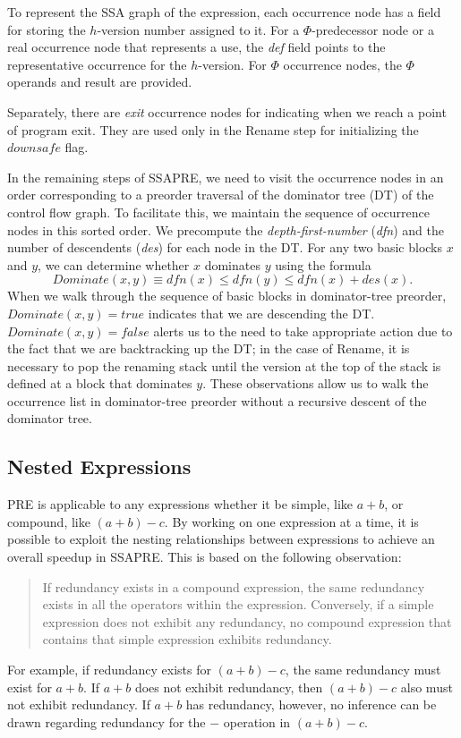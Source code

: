 To represent the SSA graph of the expression, each occurrence node has a field
for storing the $h$-version number assigned to it.  For a $\Phi$-predecessor
node or a real occurrence node that represents a use, the \emph{def} field
points to the representative occurrence for the $h$-version.  For $\Phi$
occurrence nodes, the $\Phi$ operands and result are provided.

Separately, there are \emph{exit} occurrence nodes for indicating when we
reach a point of program exit.  They are used only in the Rename step for
initializing the $downsafe$ flag.

In the remaining steps of SSAPRE, we need to visit the occurrence nodes in an
order corresponding to a preorder traversal of the dominator tree (DT) of the
control flow graph.  To facilitate this, we maintain the sequence of
occurrence nodes in this sorted order.  We precompute the 
\emph{depth-first-number} (\emph{dfn}) and the number of descendents
(\emph{des}) for each node in the DT.  For any two basic blocks $x$ and $y$,
we can determine whether $x$ dominates $y$ using the formula
$$Dominate(x,y) \equiv dfn(x) \leq dfn(y) \leq dfn(x) + des(x).$$
When we walk through the sequence of basic blocks in dominator-tree preorder,
$Dominate(x,y) = true$ indicates that we are descending the DT.
$Dominate(x,y) = false$ alerts us to the need to take appropriate action due
to the fact that we are backtracking up the DT; in the case of Rename, it is
necessary to pop the renaming stack until the version at the top of the stack
is defined at a block that dominates $y$.  These observations allow us to walk
the occurrence list in dominator-tree preorder without a recursive descent of
the dominator tree.

\subsection{Nested Expressions}

PRE is applicable to any expressions whether it be simple, like $a+b$, or
compound, like $(a+b)-c$.  By working on one expression at a time, it is 
possible to exploit the nesting relationships
between expressions to achieve an overall speedup in SSAPRE.  This is based
on the following observation:
\begin{quote}
If redundancy exists in a compound expression, the same redundancy exists in
all the operators within the expression.  Conversely, if a simple expression
does not exhibit any redundancy, no compound expression that contains that
simple expression exhibits redundancy.
\end{quote}
For example, if redundancy exists for $(a+b)-c$, the same redundancy must
exist for $a+b$.  If $a+b$ does not exhibit redundancy, then $(a+b)-c$ also
must not exhibit redundancy.  If $a+b$ has redundancy, however, no inference
can be drawn regarding redundancy for the $-$ operation in $(a+b)-c$.

